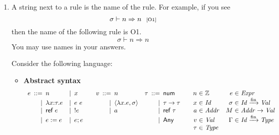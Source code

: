 \begin{enumerate}
\item A string next to a rule is the name of the rule.
For example, if you see
\[
    \sigma\vdash n\Rightarrow n
    \ \ \text{\scriptsize[O1]}
\]
then the name of the following rule is O1.
\[
    \sigma\vdash n\Rightarrow n
\]
You may use names in your answers.

Consider the following language:
  \begin{itemize}
    \item[] \textbf{Abstract syntax}
  \[
    \begin{array}{
        r@{\hskip5pt}r@{\hskip5pt}l
        r@{\hskip5pt}l@{\hskip20pt}
        r@{\hskip5pt}r@{\hskip5pt}l
        r@{\hskip5pt}r@{\hskip5pt}l@{\hskip20pt}
        r@{\hskip3pt}r@{\hskip3pt}l@{\hskip10pt}
        r@{\hskip3pt}r@{\hskip3pt}l
      }
      e &::=& n &|& x & v &::=& n & \tau &::=& \textsf{num} & n &\in& \mathbb{Z}
      & e &\in& \textit{Expr} \\
      &|& \lambda x{:}\tau.e &|& e\ e &&|& \clo{x}{e}{\sigma} &&|&
      \tau\rightarrow\tau & x &\in& \mathit{Id}
      & \sigma &\in& \finmap{\mathit{Id}}{\mathit{Val}} \\
      &|& \textsf{ref}\ e &|& !e &&|& a &&|& \textsf{ref}\ \tau & a &\in&\mathit{Addr}
      & M &\in& \mathit{Addr}\rightarrow\mathit{Val} \\
      &|& e:=e &|& e;e &&&&&|&\textsf{Any}& v &\in&\mathit{Val}
      & \Gamma &\in& \finmap{\mathit{Id}}{\mathit{Type}} \\
      &&&&&&&&&&& \tau &\in&\mathit{Type} \\
    \end{array}
  \]


\end{itemize}
\end{enumerate}
